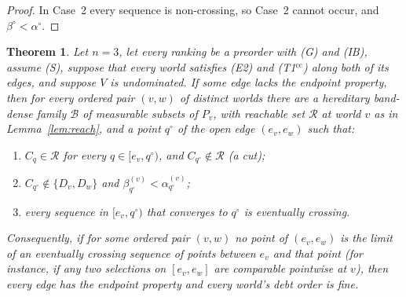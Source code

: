 \documentclass[11pt]{article}
\newtheorem{theorem}{Theorem}
\theoremstyle{definition}\newtheorem{definition}[theorem]{Definition}
\theoremstyle{remark}\newtheorem{remark}[theorem]{Remark}
\newcommand{\Bfam}{\mathcal B}
\newcommand{\Tcc}{\textup{(T1$^{\mathrm{cc}}$)}}
\begin{document}
\begin{proof}
In Case~2 every sequence is non-crossing, so Case~2 cannot occur, and
$\beta^\circ<\alpha^\circ$.
\end{proof}

\begin{theorem}\label{thm:crossing}
Let $n=3$, let every ranking be a preorder with (G) and (IB), assume (S),
suppose that every world satisfies (E2) and \Tcc{} along both of its edges,
and suppose $V$ is undominated. If some edge lacks the endpoint property,
then for every ordered pair $(v,w)$ of distinct worlds there are a
hereditary band-dense family $\Bfam$ of measurable subsets of $P_v$, with
reachable set $\mathcal R$ at world $v$ as in Lemma~\ref{lem:reach}, and a
point $q^\circ$ of the open edge $(e_v,e_w)$ such that:
\begin{enumerate}[label=(\roman*),leftmargin=*,itemsep=2pt]
\item $C_q\in\mathcal R$ for every $q\in[e_v,q^\circ)$, and
$C_{q^\circ}\notin\mathcal R$ (a \emph{cut});
\item $C_{q^\circ}\notin\{D_v,D_w\}$ and
$\beta^{(v)}_{q^\circ}<\alpha^{(v)}_{q^\circ}$;
\item every sequence in $[e_v,q^\circ)$ that converges to $q^\circ$ is
eventually crossing.
\end{enumerate}
Consequently, if for some ordered pair $(v,w)$ no point of $(e_v,e_w)$ is
the limit of an eventually crossing sequence of points between $e_v$ and
that point (for instance, if any two selections on $[e_v,e_w]$ are
comparable pointwise at $v$), then every edge has the endpoint property and
every world's debt order is fine.
\end{theorem}
\end{document}
